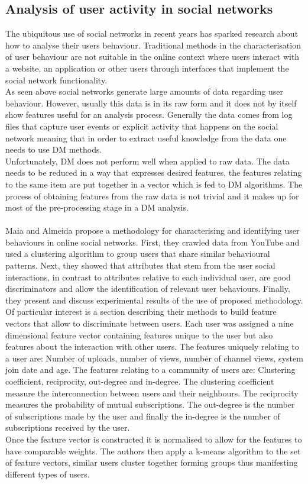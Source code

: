 \documentclass[11pt, oneside]{article}   	%
\begin{document}
\subsection{Analysis of user activity in social networks}
The ubiquitous use of social networks in recent years has sparked research about how to analyse their users behaviour. Traditional methods in the characterisation of user behaviour are not suitable in the online context where users interact with a website, an application or other users through interfaces that implement the social network functionality.\\
As seen above social networks generate large amounts of data regarding user behaviour. However, usually this data is in its raw form and it does not by itself show features useful for an analysis process. Generally the data comes from log files that capture user events or explicit activity that happens on the social network meaning that in order to extract useful knowledge from the data one needs to use DM methods.\\
Unfortunately, DM does not perform well when applied to raw data. The data needs to be reduced in a way that expresses desired features, the features relating to the same item are put together in a vector which is fed to DM algorithms. The process of obtaining features from the raw data is not trivial and it makes up for most of the pre-processing stage in a DM analysis.\\\\ 
Maia and Almeida \cite{Maia2008} propose a methodology for characterising and identifying user behaviours in online social networks. First, they crawled data from YouTube and used a clustering algorithm to group users that share similar behavioural patterns. Next, they showed that attributes that stem from the user social interactions, in contrast to attributes relative to each individual user, are good discriminators and allow the identification of relevant user behaviours. Finally, they present and discuss experimental results of the use of proposed methodology.\\
Of particular interest is a section describing their methods to build feature vectors that allow to discriminate between users. Each user was assigned a nine dimensional feature vector containing features unique to the user but also features about the interaction with other users. The features uniquely relating to a user are: Number of uploads, number of views, number of channel views, system join date and age. The features relating to a community of users are: Clustering coefficient, reciprocity, out-degree and in-degree. The clustering coefficient measure the interconnection between users and their neighbours. The reciprocity measures the probability of mutual subscriptions. The out-degree is the number of subscriptions made by the user and finally the in-degree is the number of subscriptions received by the user.\\
Once the feature vector is constructed it is normalised to allow for the features to have comparable weights. The authors then apply a k-means algorithm to the set of feature vectors, similar users cluster together forming groups thus manifesting different types of users.
\end{document}
